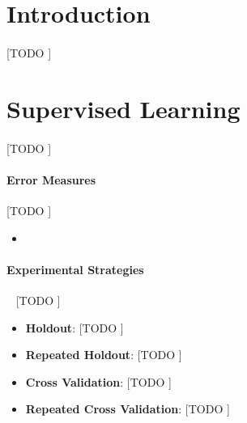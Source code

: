\documentclass{article}
\begin{document}
	\maketitle %

	\thispagestyle{fancy} %



	\begin{abstract}
		\noindent [TODO ].
	\end{abstract}



	\section{Introduction}
	\label{sec:intro}

			\paragraph{}
			[TODO ]


	\section{Supervised Learning}
	\label{sec:supervised-learning}

		\paragraph{}
		[TODO ]

		\paragraph{Error Measures}
		\label{paragraph:error-measures}
		[TODO ]

		\begin{itemize}
			\item [TODO ]
		\end{itemize}

		\paragraph{Experimental Strategies}
		\label{paragraph:experimental-strategies}
  	[TODO ]

		\begin{itemize}
			\item
				\textbf{Holdout}:
				[TODO ]

			\item
				\textbf{Repeated Holdout}:
				[TODO ]

			\item
				\textbf{Cross Validation}:
				[TODO ]

			\item
				\textbf{Repeated Cross Validation}:
				[TODO ]

		\end{itemize}
\end{document}
